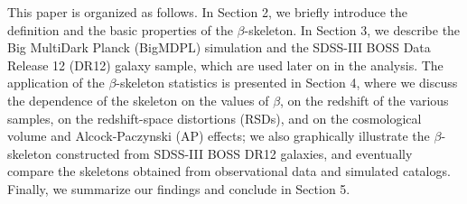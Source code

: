 \documentclass[useAMS,usenatbib]{mnras}
\begin{document}
This paper is organized as follows. 
In Section 2, we briefly introduce the definition and the basic properties of the $\beta$-skeleton. 
In Section 3, we describe the Big MultiDark Planck (BigMDPL) simulation and the SDSS-III BOSS Data Release 12 (DR12) galaxy sample, which are used later on in the analysis. 
The application of the $\beta$-skeleton statistics is presented in Section 4, 
where we discuss the dependence of the skeleton on the values of $\beta$, 
on the redshift of the various samples, on the redshift-space distortions (RSDs), and on the cosmological volume and Alcock-Paczynski (AP) effects; 
we also graphically illustrate the $\beta$-skeleton constructed from SDSS-III BOSS DR12 galaxies,
and eventually compare the skeletons obtained from observational data and simulated catalogs.  
Finally, we summarize our findings and conclude in Section 5. 


\cite{2017A&A...600A.125C}


 
\end{document}
